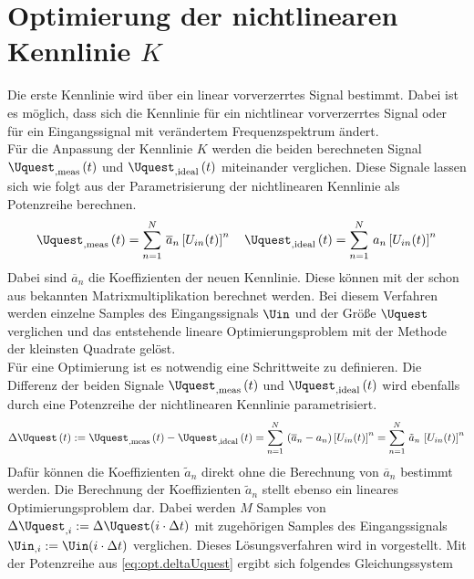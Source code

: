 \documentclass[../Report.tex]{subfiles}
\begin{document}
\section{Optimierung der nichtlinearen Kennlinie $K$}
\label{sec:opt.K}
Die erste Kennlinie wird über ein linear vorverzerrtes Signal bestimmt. Dabei ist es möglich, dass sich die Kennlinie für ein nichtlinear vorverzerrtes Signal oder für ein Eingangssignal mit verändertem Frequenzspektrum ändert. \\
Für die Anpassung der Kennlinie $K$ werden die beiden berechneten Signal $\Uquest_{, \mathrm{meas}} \oft$ und $\Uquest_{, \mathrm{ideal}} \oft$ miteinander verglichen. Diese Signale lassen sich wie folgt aus der Parametrisierung der nichtlinearen Kennlinie als Potenzreihe berechnen.
\begin{align}
	\Uquest_{, \mathrm{meas}} \oft = \sum_{n=1}^N \, \overline{a}_n \left[ U_{in}(t) \right]^n
	\quad
	\Uquest_{, \mathrm{ideal}} \oft = \sum_{n=1}^N \, a_n \left[ U_{in}(t) \right]^n
\end{align}
Dabei sind $\overline{a}_n$ die Koeffizienten der neuen Kennlinie. Diese können mit der schon aus \cite{harzheim} bekannten Matrixmultiplikation berechnet werden. Bei diesem Verfahren werden einzelne Samples des Eingangssignals $\Uin$ und der Größe $\Uquest$ verglichen und das entstehende lineare Optimierungsproblem mit der Methode der kleinsten Quadrate gelöst. \\
Für eine Optimierung ist es notwendig eine Schrittweite zu definieren. Die Differenz der beiden Signale $\Uquest_{, \mathrm{meas}} \oft$ und $\Uquest_{, \mathrm{ideal}} \oft$ wird ebenfalls durch eine Potenzreihe der nichtlinearen Kennlinie parametrisiert.
\begin{align}
\label{eq:opt.deltaUquest}
	\Delta \Uquest \oft := \Uquest_{, \mathrm{meas}} \oft - \Uquest_{, \mathrm{ideal}} \oft
	=
	\sum_{n=1}^N \, \left( \overline{a}_n -  a_n\right) \left[ U_{in}(t) \right]^n
	=
	\sum_{n=1}^N \, \tilde{a}_n \, \left[ U_{in}(t) \right]^n	
\end{align}
Dafür können die Koeffizienten $\tilde{a}_n$ direkt ohne die Berechnung von $\overline{a}_n$ bestimmt werden. Die Berechnung der Koeffizienten $\tilde{a}_n$ stellt ebenso ein lineares Optimierungsproblem dar. Dabei werden $M$ Samples von ${\Delta \Uquest_{,i} := \Delta \Uquest (i \cdot \Delta t)}$ mit zugehörigen Samples des Eingangssignals ${\Uin_{,i} := \Uin (i \cdot \Delta t)}$ verglichen. Dieses Lösungsverfahren wird in \cite{harzheim} vorgestellt. Mit der Potenzreihe aus \eqref{eq:opt.deltaUquest} ergibt sich folgendes Gleichungssystem
\end{document}
